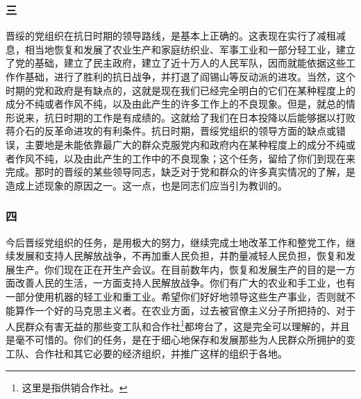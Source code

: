 \documentclass[cn,11pt,chinese]{elegantbook}
\def\myformat#1{\hfil\hfil #1}
\begin{document}
\subsubsection*{\myformat{三}}
晋绥的党组织在抗日时期的领导路线，是基本上正确的。这表现在实行了减租减息，相当地恢复和发展了农业生产和家庭纺织业、军事工业和一部分轻工业，建立了党的基础，建立了民主政府，建立了近十万人的人民军队，因而就能依据这些工作作基础，进行了胜利的抗日战争，并打退了阎锡山等反动派的进攻。当然，这个时期的党和政府是有缺点的，这就是现在我们已经完全明白的它们在某种程度上的成分不纯或者作风不纯，以及由此产生的许多工作上的不良现象。但是，就总的情形说来，抗日时期的工作是有成绩的。这就给了我们在日本投降以后能够据以打败蒋介石的反革命进攻的有利条件。抗日时期，晋绥党组织的领导方面的缺点或错误，主要地是未能依靠最广大的群众克服党内和政府内在某种程度上的成分不纯或者作风不纯，以及由此产生的工作中的不良现象；这个任务，留给了你们到现在来完成。那时的晋绥的某些领导同志，缺乏对于党和群众的许多真实情况的了解，是造成上述现象的原因之一。这一点，也是同志们应当引为教训的。\\
\subsubsection*{\myformat{四}}
今后晋绥党组织的任务，是用极大的努力，继续完成土地改革工作和整党工作，继续发展和支持人民解放战争，不再加重人民负担，并酌量减轻人民负担，恢复和发展生产。你们现在正在开生产会议。在目前数年内，恢复和发展生产的目的是一方面改善人民的生活，一方面支持人民解放战争。你们有广大的农业和手工业，也有一部分使用机器的轻工业和重工业。希望你们好好地领导这些生产事业，否则就不能算作一个好的马克思主义者。在农业方面，过去被官僚主义分子所把持的、对于人民群众有害无益的那些变工队和合作社\footnote[4]{ 这里是指供销合作社。}都垮台了，这是完全可以理解的，并且是毫不可惜的。你们的任务，是在于细心地保存和发展那些为人民群众所拥护的变工队、合作社和其它必要的经济组织，并推广这样的组织于各地。\\
\end{document}
